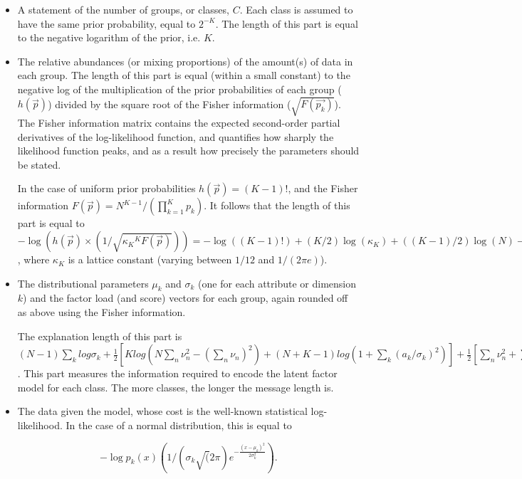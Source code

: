 \documentclass{elsarticle}
\begin{document}
\begin{itemize}
\item[\textbf{1a)}] A statement of the number of groups, or classes, $C$. Each class is assumed to have the same prior probability, equal to $2^{-K}$. The length of this part is equal to the negative logarithm of the prior, i.e. $K$. 
\item[\textbf{1b)}] The relative abundances (or mixing proportions) of the amount(s) of data in each group. 
		The length of this 
		part is equal (within a small constant) to the negative log of the multiplication of the prior probabilities
		of each group ($h(\vec{p})$) divided by the square root of the Fisher information ($\sqrt{F(\vec{p_k})}$). 
		The Fisher information matrix contains the expected second-order partial derivatives of the log-likelihood function, and quantifies how sharply the likelihood function peaks, and as a result how precisely the parameters should be stated.
	
	In the case of uniform prior probabilities $h(\vec{p}) = (K-1)!$, and the Fisher information $F(\vec{p}) = N^{K-1} / (\prod_{k=1}^{K} p_k)$. It follows that the length of this part is equal to $- \log( h(\vec{p}) \times (1 / \sqrt{{\kappa_K}^K F(\vec{p})}) ) = - \log((K-1)!) + (K/2) \log(\kappa_K) + ((K-1)/2) \log(N) - (1/2) \sum_{k=1}^{K} \log(p_k)$, where $\kappa_K$ is a lattice constant (varying between $1/12$ and $1/(2 \pi e)$).
	
\item[\textbf{1c)}] The distributional parameters $\mu_k$ and $\sigma_k$ 
		(one for each attribute or dimension  $k$) and the factor
		load (and score) vectors for each group, again rounded off as above using the Fisher information.
	
	The explanation length of this part is $(N-1)\sum_k log \sigma_k + \frac{1}{2}[K log (N \sum_n \nu_n^2 - (\sum_n\nu_n)^2) + (N+K-1) log(1+\sum_k(a_k/\sigma_k)^2)] + \frac{1}{2} [\sum_n \nu_n^2 + \sum_n \sum_k (x_{nk} \mu_k - v_na_k)^2/\sigma_k^2]$. This part measures the information required to encode the latent factor model for each class. The more classes, the longer the message length is.
	
\item[\textbf{2)}] The data given the model, whose cost is the well-known statistical log-likelihood. 
	In the case of a normal distribution, this is equal to 
	
	$$-\log p_k(x) (1/(\sigma_k \sqrt(2\pi) e^{-\frac{(x-\mu_k)^2}{2\sigma_k^2}}).$$
\end{itemize}
\end{document}
